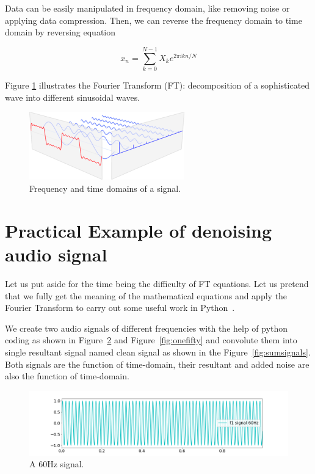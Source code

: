 \documentclass[a4paper, 12pt]{scrartcl}
\begin{document}
Data can be easily manipulated in frequency domain, like removing noise or applying data compression.
Then, we can reverse the frequency domain to time domain by reversing equation

\begin{equation}
  x_n = \sum_{k=0}^{N-1} X_k e^{2 \pi i k n / N}
\end{equation}

Figure \ref{fig:fourier} illustrates the Fourier Transform (FT): decomposition of a sophisticated wave into different sinusoidal waves.

\begin{figure}[H] 
  \centering
  \includegraphics[width=0.6\textwidth]{img/fourier-dimensions.png}
  \caption{Frequency and time domains of a signal.}
  \label{fig:fourier}
\end{figure}
\section{Practical Example of denoising audio signal}
Let us put aside for the time being the difficulty of FT equations.
Let us pretend that we fully get the meaning of the mathematical equations and apply the Fourier Transform to carry out some useful work in Python~\cite{CleanUpNoise}.

We create two audio signals of different frequencies with the help of python coding as shown in Figure~\ref{fig:sixty} and Figure~\ref{fig:onefifty} 
and convolute them into single resultant signal named clean signal as shown in the Figure~\ref{fig:sumsignals}. 
Both signals are the function of time-domain, their resultant and added noise are also the function of time-domain.

\begin{figure}[H] 
  \centering
  \includegraphics[width=\textwidth]{img/signal_60hz.png}
  \caption{A 60Hz signal.}
  \label{fig:sixty}
\end{figure}
\end{document}
